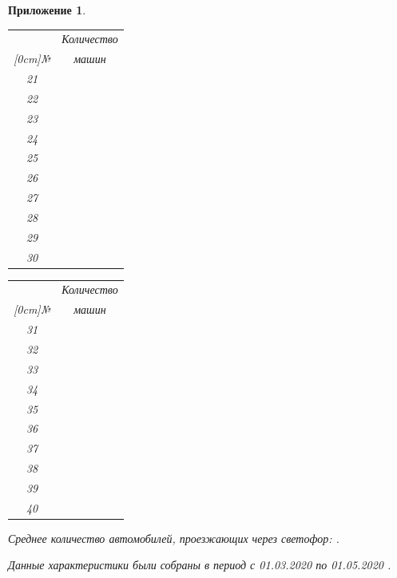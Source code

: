 \documentclass[12pt, a4paper]{extarticle}
\numberwithin{equation}{section}
\newtheorem{attachment}{\hspace{12cm}  Приложение}
\numberwithin{figure}{section}
\begin{document}
\begin{attachment}
\begin{table}[h!]
\begin{minipage}{0.23\linewidth}
		\begin{tabular}{|c|c|}
			\hline
			& Количество \\ 
			\raisebox{1.5ex}[0cm]{№}
			& машин 
			\\\hline
			21 & 
			\\\hline
			22 & 
			\\\hline
			23 & 
			\\\hline
			24 & 
			\\\hline
			25 & 
			\\\hline
			26 & 
			\\\hline
			27 & 
			\\\hline
			28 & 
			\\\hline
			29 & 
			\\\hline
			30 & 
			\\\hline
		\end{tabular}
	\end{minipage} 
	\begin{minipage}{0.23\linewidth}
		\centering
		
		\begin{tabular}{|c|c|}
			\hline
			& Количество \\ 
			\raisebox{1.5ex}[0cm]{№}
			& машин 
			\\\hline
			31 & 
			\\\hline
			32 & 
			\\\hline
			33 & 
			\\\hline
			34 & 
			\\\hline
			35 & 
			\\\hline
			36 & 
			\\\hline
			37 & 
			\\\hline
			38 & 
			\\\hline
			39 & 
			\\\hline
			40 & 
			\\\hline
		\end{tabular}
	\end{minipage}
\end{table}
\noindent Среднее количество автомобилей, проезжающих через светофор: .
\newline

\noindent\textup{Данные характеристики были собраны в период с 01.03.2020 по 01.05.2020 }.
\end{attachment}
\end{document}
